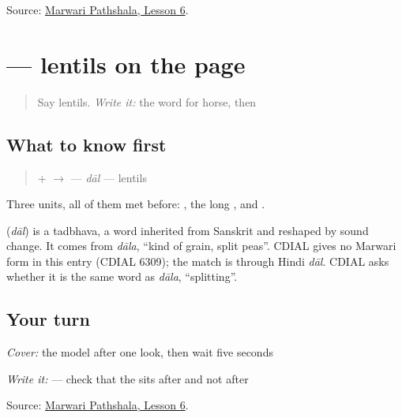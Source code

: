 \begin{tcolorbox}[breakable,colback=teal!4,colframe=teal!35!black,title={Before you move on}]
Source: \href{https://www.marwaripathshala.com/marwari-lesson-6-english}{Marwari Pathshala, Lesson 6}.
\end{tcolorbox}
\section[\texorpdfstring{\mw{दाल} (dāl)}{दाल (dāl)}]{ — lentils on the page}

\label{lesson:MW-C18-daal}



\begin{quote}
Say lentils. \emph{Write it:} the word for horse, then \textbf{}
\end{quote}

\subsection*{What to know first}
\begin{quote}
\textbf{} + \textbf{} $\to$ \textbf{} — \emph{dāl} — lentils
\end{quote}

Three units, all of them met before: \textbf{}, the long \textbf{}, and \textbf{}.

\begin{cousinweb}
\textbf{} (\emph{dāl}) is a tadbhava, a word inherited from Sanskrit and reshaped by sound change. It comes from \emph{dāla}, \textquotedblleft{}kind of grain, split peas\textquotedblright{}. CDIAL gives no Marwari form in this entry (CDIAL 6309); the match is through Hindi \emph{dāl}. CDIAL asks whether it is the same word as \emph{dāla}, \textquotedblleft{}splitting\textquotedblright{}.
\end{cousinweb}

\subsection*{Your turn}
\emph{Cover:} the model after one look, then wait five seconds

\emph{Write it:} \textbf{} — check that the \textbf{} sits after \textbf{} and not after \textbf{}

\begin{tcolorbox}[breakable,colback=teal!4,colframe=teal!35!black,title={Before you move on}]
Source: \href{https://www.marwaripathshala.com/marwari-lesson-6-english}{Marwari Pathshala, Lesson 6}.
\end{tcolorbox}
